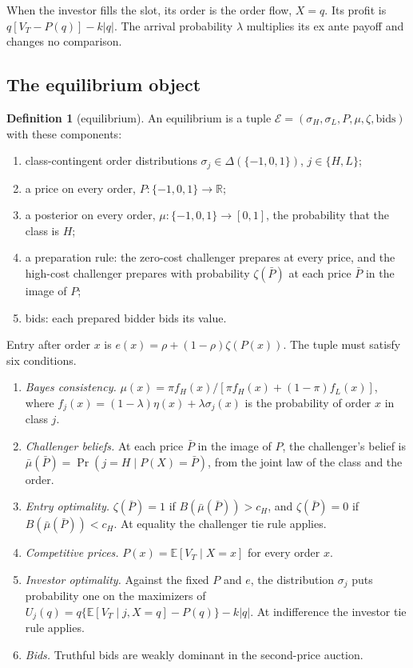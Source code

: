 \documentclass[11pt]{article}
\theoremstyle{definition}
\newtheorem{definition}{Definition}
\newcommand{\E}{\mathbb E}
\begin{document}
When the investor fills the slot, its order is the order flow, $X=q$. Its profit is $q[V_T-P(q)]-k|q|$.
The arrival probability $\lambda$ multiplies its ex ante payoff and changes no comparison.

\subsection{The equilibrium object}

\begin{definition}[equilibrium]\label{def:eq}
An equilibrium is a tuple $\mathcal E=(\sigma_H,\sigma_L,P,\mu,\zeta,\text{bids})$ with these components:
\begin{enumerate}[label=(\roman*)]
\item class-contingent order distributions $\sigma_j\in\Delta(\{-1,0,1\})$, $j\in\{H,L\}$;
\item a price on every order, $P:\{-1,0,1\}\to\mathbb R$;
\item a posterior on every order, $\mu:\{-1,0,1\}\to[0,1]$, the probability that the class is $H$;
\item a preparation rule: the zero-cost challenger prepares at every price, and the high-cost challenger
  prepares with probability $\zeta(\bar P)$ at each price $\bar P$ in the image of $P$;
\item bids: each prepared bidder bids its value.
\end{enumerate}
Entry after order $x$ is $e(x)=\rho+(1-\rho)\zeta(P(x))$. The tuple must satisfy six conditions.
\begin{enumerate}[label=(E\arabic*)]
\item \emph{Bayes consistency.} $\mu(x)=\pi f_H(x)/[\pi f_H(x)+(1-\pi)f_L(x)]$, where
  $f_j(x)=(1-\lambda)\eta(x)+\lambda\sigma_j(x)$ is the probability of order $x$ in class $j$.
\item \emph{Challenger beliefs.} At each price $\bar P$ in the image of $P$, the challenger's belief is
  $\bar\mu(\bar P)=\Pr(j=H\mid P(X)=\bar P)$, from the joint law of the class and the order.
\item \emph{Entry optimality.} $\zeta(\bar P)=1$ if $B(\bar\mu(\bar P))>c_H$, and $\zeta(\bar P)=0$ if
  $B(\bar\mu(\bar P))<c_H$. At equality the challenger tie rule applies.
\item \emph{Competitive prices.} $P(x)=\E[V_T\mid X=x]$ for every order $x$.
\item \emph{Investor optimality.} Against the fixed $P$ and $e$, the distribution $\sigma_j$ puts probability one
  on the maximizers of $U_j(q)=q\{\E[V_T\mid j,X=q]-P(q)\}-k|q|$. At indifference the investor tie rule applies.
\item \emph{Bids.} Truthful bids are weakly dominant in the second-price auction.
\end{enumerate}
\end{definition}
\end{document}
